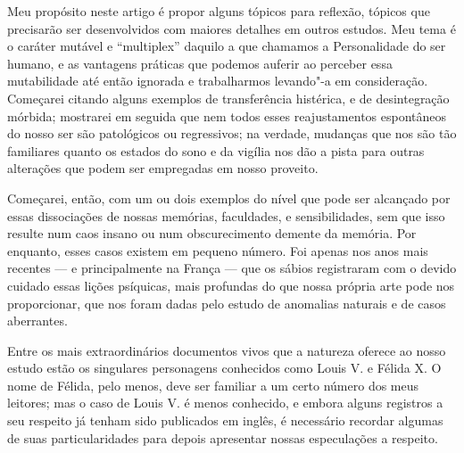 Meu propósito neste artigo é propor alguns tópicos para reflexão,
tópicos que precisarão ser desenvolvidos com maiores detalhes em outros
estudos. Meu tema é o caráter mutável e “multiplex” daquilo a que
chamamos a Personalidade do ser humano, e as vantagens práticas que
podemos auferir ao perceber essa mutabilidade até então ignorada e
trabalharmos levando"-a em consideração.  Começarei citando alguns
exemplos de transferência histérica, e de desintegração mórbida;
mostrarei em seguida que nem todos esses reajustamentos espontâneos do
nosso ser são patológicos ou regressivos; na verdade, mudanças que nos
são tão familiares quanto os estados do sono e da vigília nos dão a
pista para outras alterações que podem ser empregadas em nosso
proveito.

Começarei, então, com um ou dois exemplos do nível que pode ser
alcançado por essas dissociações de nossas memórias, faculdades, e
sensibilidades, sem que isso resulte num caos insano ou num
obscurecimento demente da memória. Por enquanto, esses casos existem em
pequeno número. Foi apenas nos anos mais recentes --- e
principalmente na França --- que os sábios registraram com o devido
cuidado essas lições psíquicas, mais profundas do que nossa própria
arte pode nos proporcionar, que nos foram dadas pelo estudo de
anomalias naturais e de casos aberrantes. 

Entre os mais extraordinários documentos vivos que a natureza oferece ao
nosso estudo estão os singulares personagens conhecidos como Louis V. e
Félida X.  O nome de Félida, pelo menos, deve ser familiar a um certo
número dos meus leitores; mas o caso de Louis V. é menos conhecido, e
embora alguns registros a seu respeito já tenham sido publicados em
inglês, é necessário recordar algumas de suas particularidades para
depois apresentar nossas especulações a respeito.

